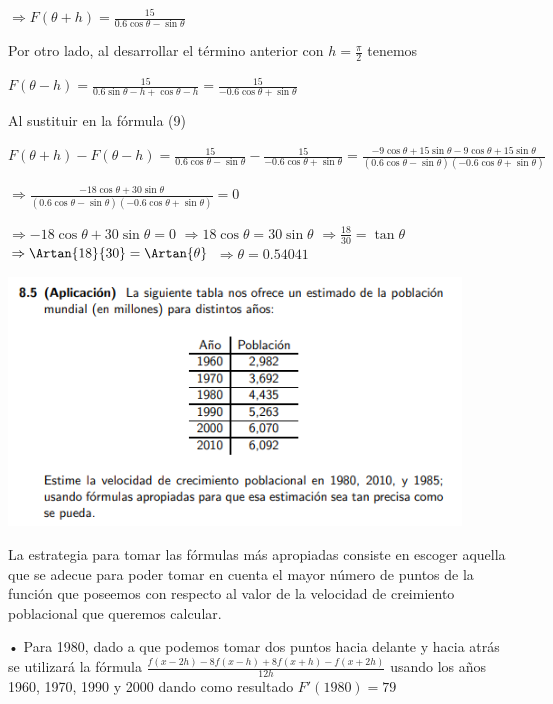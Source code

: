 \documentclass[11pt]{article}
\begin{document}
$\Rightarrow F(\theta+h) = \frac{15}{0.6\cos{\theta}-\sin{\theta}}$

Por otro lado, al desarrollar el término anterior con $h = \frac{\pi}{2}$  tenemos

$F(\theta-h) = \frac{15}{0.6\sin{\theta-h}+\cos{\theta-h}} =  \frac{15}{-0.6\cos{\theta}+\sin{\theta}}$

Al sustituir en la fórmula (9)

$F(\theta+h)-F(\theta-h) = \frac{15}{0.6\cos{\theta}-\sin{\theta}} - \frac{15}{-0.6\cos{\theta}+\sin{\theta}} = \frac{-9\cos{\theta}+15\sin{\theta}-9\cos{\theta}+15\sin{\theta}}
{(0.6\cos{\theta}-\sin{\theta})(-0.6\cos{\theta}+\sin{\theta})} $

$\Rightarrow \frac{-18\cos{\theta}+30\sin{\theta}}
{(0.6\cos{\theta}-\sin{\theta})(-0.6\cos{\theta}+\sin{\theta})} = 0$ 

$\Rightarrow -18\cos{\theta}+30\sin{\theta} = 0$ $\Rightarrow 18\cos{\theta} = 30\sin{\theta} $ $\Rightarrow \frac{18}{30} = \tan{\theta} $ $\Rightarrow \Artan{18}{30} = \Artan{\theta} $ $\Rightarrow  \theta= 0.54041 $

\begin{center}
    \includegraphics[keepaspectratio, width=12cm]{S4.png}
    \caption{\\}
\end{center} 

La estrategia para tomar las fórmulas más apropiadas consiste en escoger aquella que se adecue para poder tomar en cuenta el mayor número de puntos de la función que poseemos con respecto al valor de la velocidad de creimiento poblacional que queremos calcular.

• Para 1980, dado a que podemos tomar dos puntos hacia delante y hacia atrás se utilizará la fórmula  $\frac{f(x - 2h)  -8 f(x - h)+ 8 f(x + h) - f(x + 2h)}{12h}$ usando los años 1960, 1970, 1990 y 2000 dando como resultado $F'(1980) = 79$
\end{document}
